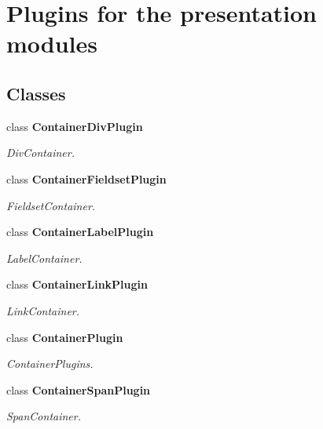 \section{Plugins for the presentation modules}
\label{group__OWL__UI__PLUGINS}
\subsection*{Classes}
\begin{DoxyCompactItemize}
\item 
class {\bf ContainerDivPlugin}
\begin{DoxyCompactList}\small\item\em DivContainer. \end{DoxyCompactList}\item 
class {\bf ContainerFieldsetPlugin}
\begin{DoxyCompactList}\small\item\em FieldsetContainer. \end{DoxyCompactList}\item 
class {\bf ContainerLabelPlugin}
\begin{DoxyCompactList}\small\item\em LabelContainer. \end{DoxyCompactList}\item 
class {\bf ContainerLinkPlugin}
\begin{DoxyCompactList}\small\item\em LinkContainer. \end{DoxyCompactList}\item 
class {\bf ContainerPlugin}
\begin{DoxyCompactList}\small\item\em ContainerPlugins. \end{DoxyCompactList}\item 
class {\bf ContainerSpanPlugin}
\begin{DoxyCompactList}\small\item\em SpanContainer. \end{DoxyCompactList}\end{DoxyCompactItemize}
